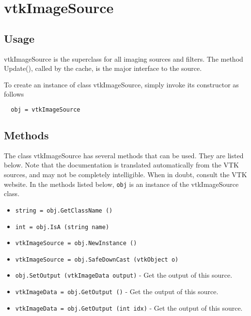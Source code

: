\section{vtkImageSource}

\subsection{Usage}

 vtkImageSource is the superclass for all imaging sources and filters.
 The method Update(), called by the cache, is the major interface
 to the source.

To create an instance of class vtkImageSource, simply
invoke its constructor as follows
\begin{verbatim}
  obj = vtkImageSource
\end{verbatim}
\subsection{Methods}

The class vtkImageSource has several methods that can be used.
  They are listed below.
Note that the documentation is translated automatically from the VTK sources,
and may not be completely intelligible.  When in doubt, consult the VTK website.
In the methods listed below, \verb|obj| is an instance of the vtkImageSource class.
\begin{itemize}
\item  \verb|string = obj.GetClassName ()|

\item  \verb|int = obj.IsA (string name)|

\item  \verb|vtkImageSource = obj.NewInstance ()|

\item  \verb|vtkImageSource = obj.SafeDownCast (vtkObject o)|

\item  \verb|obj.SetOutput (vtkImageData output)| -  Get the output of this source.

\item  \verb|vtkImageData = obj.GetOutput ()| -  Get the output of this source.

\item  \verb|vtkImageData = obj.GetOutput (int idx)| -  Get the output of this source.

\end{itemize}
